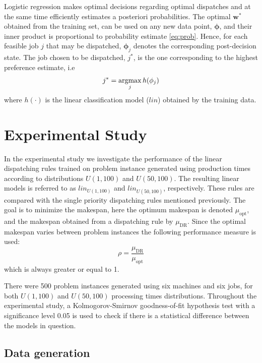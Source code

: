 \documentclass[10pt]{llncs}
\renewcommand{\vec}[1]{{\mbox{\boldmath$#1$}}}
\def\argmax{\mathop{\rm argmax}}
\renewcommand{\vec}[1]{{\mathbf #1}}
\begin{document}
Logistic regression makes optimal decisions regarding optimal dispatches and at the same time efficiently estimates a posteriori probabilities. The optimal $\vec{w}^*$ obtained from the training set, can be used on any new data point, $\vec{\phi}$, and their inner product is proportional to probability estimate \eqref{eq:prob}. Hence, for each feasible job $j$ that may be dispatched, $\vec{\phi}_j$ denotes the corresponding post-decision state. The job chosen to be dispatched, $j^*$, is the one corresponding to the highest preference estimate, i.e 
\begin{equation}\label{eq:lin}
j^*=\argmax_{j} h(\vec{\phi}_j)
\end{equation}
where $h(\cdot)$ is the linear classification model ($lin$) obtained by the training data. 

\section{Experimental Study}\label{sec:Experimental}

In the experimental study we investigate the performance of the linear dispatch\-ing rules trained on problem instance generated using production times according to distributions $U(1,100)$ and $U(50,100)$. The resulting linear models is referred to as $lin_{U(1,100)}$ and $lin_{U(50,100)}$, respectively. These rules are compared with the single priority dispatching rules mentioned previously. The goal is to minimize the makespan, here the optimum makespan is denoted $\mu_{\text{opt}}$, and the makespan obtained from a dispatching rule by $\mu_{\text{DR}}$. Since the optimal makespan varies between problem instances the following performance measure is used:
\begin{equation}\label{eq:ratio}\rho=\frac{\mu_{\text{DR}}}{\mu_{\text{opt}}}\end{equation}
which is always greater or equal to 1.

There were 500 problem instances generated using six machines and six jobs, for both $U(1,100)$ and $U(50,100)$ processing times distributions. %
Throughout the experimental study, a Kolmogorov-Smirnov goodness-of-fit hypothesis test with a significance level 0.05 is used to check if there is a statistical difference between the models in question.

\subsection{Data generation}\label{sec:datagen}
\end{document}
